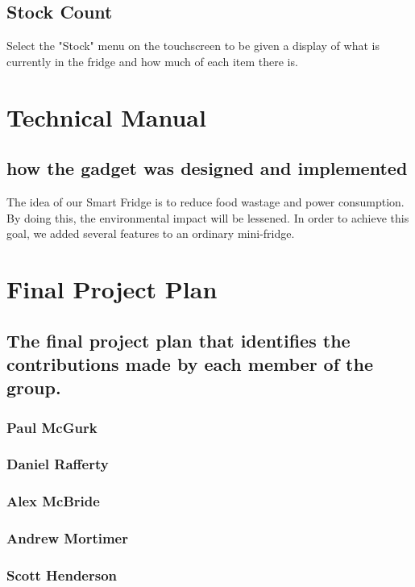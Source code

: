 \documentclass[10pt]{article}
\begin{document}
\subsection{Stock Count}
Select the "Stock" menu on the touchscreen to be given a display of what is currently in the fridge and how much of each item there is.




\section{Technical Manual}
\subsection{how the gadget was designed and implemented}
The idea of our Smart Fridge is to reduce food wastage and power consumption. By doing this, the environmental impact will be lessened. In order to achieve this goal, we added several features to an ordinary mini-fridge.

\section{Final Project Plan}
\subsection{The final project plan that identifies the contributions made by each member of the group.}
\subsubsection{Paul McGurk}
\subsubsection{Daniel Rafferty}
\subsubsection{Alex McBride}
\subsubsection{Andrew Mortimer}
\subsubsection{Scott Henderson}
\end{document}
